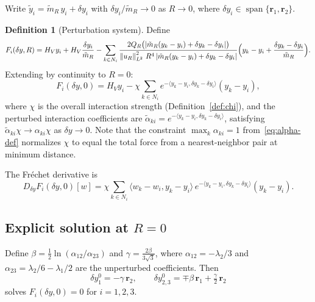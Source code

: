 \documentclass[11pt]{article}
\theoremstyle{plain}%
\theoremstyle{definition}%
\newtheorem{defn}[thm]{Definition}%
\theoremstyle{definition}%
\theoremstyle{remark}%
\numberwithin{equation}{section}
\newcommand{\HV}{H_V}
\newcommand{\ip}[2]{\langle #1, #2 \rangle}
\newcommand{\norm}[1]{\left\| #1 \right\|}
\begin{document}
Write $\tilde{y}_i = \tilde{m}_R\,y_i + \delta y_i$ with $\delta y_i/\tilde{m}_R\to 0$ as $R\to 0$, where $\delta y_i\in\operatorname{span}\{\boldsymbol{r}_1,\boldsymbol{r}_2\}$.

\begin{defn}[Perturbation system]\label{def:Fi}
Define
\begin{equation}\label{eq:Fi-def}
F_i(\delta y,R) = \HV y_i + \HV\frac{\delta y_i}{\tilde{m}_R} - \sum_{k\in N_i}\frac{2Q_R\bigl(|\tilde{m}_R(y_k-y_i)+\delta y_k-\delta y_i|\bigr)}{\norm{u_R}_{L^2}^2\,R^4\,|\tilde{m}_R(y_k-y_i)+\delta y_k-\delta y_i|}\Bigl(y_k-y_i+\frac{\delta y_k-\delta y_i}{\tilde{m}_R}\Bigr).
\end{equation}
Extending by continuity to $R=0$:
\begin{equation}\label{eq:Fi-zero}
F_i(\delta y,0) = \HV y_i - \chi\sum_{k\in N_i} e^{-\ip{y_k-y_i}{\delta y_k-\delta y_i}}(y_k-y_i),
\end{equation}
where $\chi$ is the overall interaction strength (Definition~\ref{def:chi}), and the perturbed interaction coefficients are $\tilde{\alpha}_{ki}=e^{-\ip{y_k-y_i}{\delta y_k-\delta y_i}}$, satisfying $\tilde{\alpha}_{ki}\chi \to \alpha_{ki}\chi$ as $\delta y\to 0$. Note that the constraint $\max_k\alpha_{ki}=1$ from~\eqref{eq:alpha-def} normalizes $\chi$ to equal the total force from a nearest-neighbor pair at minimum distance.

The Fr\'echet derivative is
\begin{equation}\label{eq:Fi-deriv}
D_{\delta y}F_i(\delta y,0)[w] = \chi\sum_{k\in N_i}\ip{w_k-w_i}{y_k-y_i}\,e^{-\ip{y_k-y_i}{\delta y_k-\delta y_i}}(y_k-y_i).
\end{equation}
\end{defn}


\subsection{Explicit solution at $R=0$}\label{subsec:explicit}

\begin{prop}\label{prop:explicit-soln}
Define $\beta=\frac{1}{2}\ln(\alpha_{12}/\alpha_{23})$ and $\gamma=\frac{2\beta}{3\sqrt{3}}$, where $\alpha_{12}=-\lambda_2/3$ and $\alpha_{23}=\lambda_2/6-\lambda_1/2$ are the unperturbed coefficients. Then
\begin{equation}\label{eq:delta-y0}
\delta y_1^0 = -\gamma\,\boldsymbol{r}_2, \qquad \delta y_{2,3}^0 = \mp\beta\,\boldsymbol{r}_1 + \tfrac{\gamma}{2}\,\boldsymbol{r}_2
\end{equation}
solves $F_i(\delta y,0)=0$ for $i=1,2,3$.
\end{prop}
\end{document}
